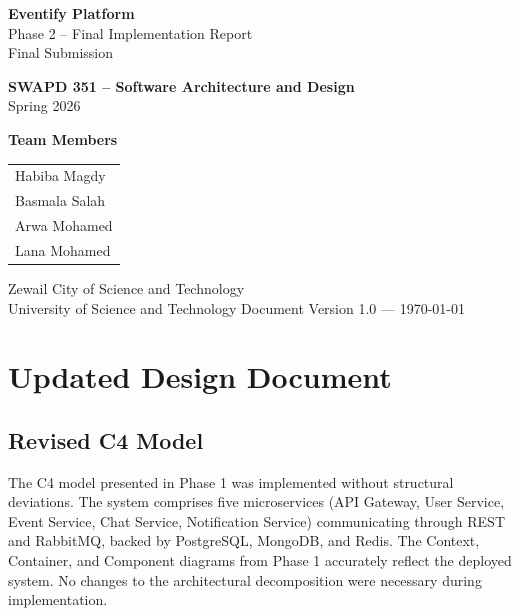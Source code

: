 \documentclass[12pt,a4paper]{article}
\begin{document}
\begin{titlepage}
\centering
\vspace*{1cm}
{\Huge\bfseries\color{zewailblue} Eventify Platform}\\[0.5cm]
{\Large Phase 2 -- Final Implementation Report}\\[0.3cm]
{\large Final Submission}
\vspace{1.5cm}

{\large\textbf{SWAPD 351 -- Software Architecture and Design}}\\[0.3cm]
{\large Spring 2026}
\vspace{2cm}

{\large\textbf{Team Members}}\\[0.5cm]
\begin{tabular}{l}
Habiba Magdy \\
Basmala Salah \\
Arwa Mohamed \\
Lana Mohamed \\
\end{tabular}
\vspace{2cm}

{\large Zewail City of Science and Technology}\\[0.3cm]
{\large University of Science and Technology}
\vfill
{\small Document Version 1.0 --- \today}
\end{titlepage}

\tableofcontents
\newpage

\section{Updated Design Document}

\subsection{Revised C4 Model}

The C4 model presented in Phase 1 was implemented without structural deviations. The system comprises five microservices (API Gateway, User Service, Event Service, Chat Service, Notification Service) communicating through REST and RabbitMQ, backed by PostgreSQL, MongoDB, and Redis. The Context, Container, and Component diagrams from Phase 1 accurately reflect the deployed system. No changes to the architectural decomposition were necessary during implementation.
\end{document}
